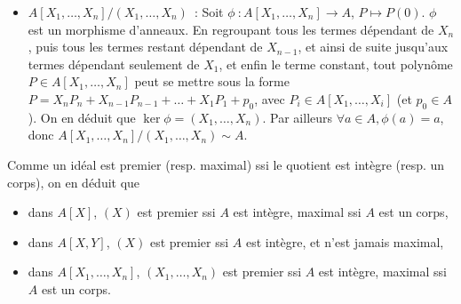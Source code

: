 {{\begin{itemize}
   \item $A[X_{1},\dots,X_{n}]/(X_{1},\dots,X_{n})$~:
     Soit $\phi~:A[X_{1},\dots,X_{n}]\to A$, $P\mapsto P(0)$. $\phi$ est
     un morphisme d'anneaux. En regroupant tous les termes dépendant de
     $X_{n}$, puis tous les termes restant dépendant de $X_{n-1}$, et
     ainsi de suite jusqu'aux termes dépendant seulement de $X_{1}$, et
     enfin le terme constant, tout polynôme $P\in A[X_{1},\dots,X_{n}]$
     peut se mettre sous la forme
     $P=X_{n}P_{n}+X_{n-1}P_{n-1}+\dots+X_{1}P_{1}+p_{0}$, avec $P_{i}\in
     A[X_{1},\dots,X_{i}]$ (et $p_{0}\in A$). On en déduit que
     $\ker\phi=(X_{1},\dots,X_{n})$. Par ailleurs $\forall a\in A,
     \phi(a)=a$, donc $A[X_{1},\dots,X_{n}]/(X_{1},\dots,X_{n})\sim A$.
  \end{itemize}
  
  Comme un idéal est premier (resp. maximal) ssi le quotient est intègre
  (resp. un corps), on en déduit que
  \begin{itemize}
  \item dans $A[X]$, $(X)$ est premier ssi $A$ est intègre, maximal ssi $A$ est un corps,
  \item dans $A[X,Y]$, $(X)$ est premier ssi $A$ est intègre, et n'est jamais maximal,
  \item dans $A[X_{1},\dots,X_{n}]$, $(X_{1},\dots,X_{n})$ est premier
    ssi $A$ est intègre, maximal ssi $A$ est un corps.
  \end{itemize}}
}